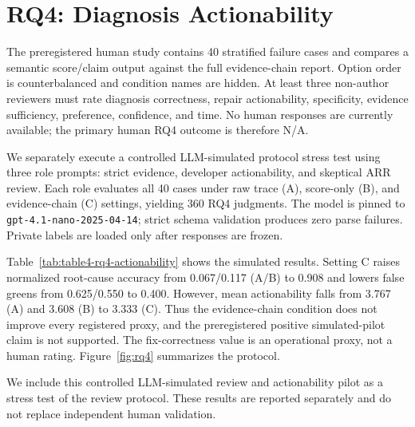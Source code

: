 \section{RQ4: Diagnosis Actionability}
The preregistered human study contains 40 stratified failure cases and compares
a semantic score/claim output against the full evidence-chain report. Option
order is counterbalanced and condition names are hidden. At least three
non-author reviewers must rate diagnosis correctness, repair actionability,
specificity, evidence sufficiency, preference, confidence, and time. No human
responses are currently available; the primary human RQ4 outcome is therefore
N/A.

We separately execute a controlled LLM-simulated protocol stress test using
three role prompts: strict evidence, developer actionability, and skeptical ARR
review. Each role evaluates all 40 cases under raw trace (A), score-only (B), and
evidence-chain (C) settings, yielding 360 RQ4 judgments. The model is pinned to
\texttt{gpt-4.1-nano-2025-04-14}; strict schema validation produces zero parse
failures. Private labels are loaded only after responses are frozen.

Table~\ref{tab:table4-rq4-actionability} shows the simulated results. Setting C
raises normalized root-cause accuracy from 0.067/0.117 (A/B) to 0.908 and lowers
false greens from 0.625/0.550 to 0.400. However, mean actionability falls from
3.767 (A) and 3.608 (B) to 3.333 (C). Thus the evidence-chain condition does not
improve every registered proxy, and the preregistered positive simulated-pilot
claim is not supported. The fix-correctness value is an operational proxy, not
a human rating. Figure~\ref{fig:rq4} summarizes the protocol.

We include this controlled LLM-simulated review and actionability pilot as a
stress test of the review protocol. These results are reported separately and
do not replace independent human validation.



